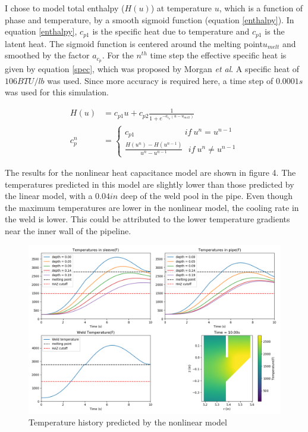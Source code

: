 \documentclass{article}
\makeatletter
\newcommand{\autocitel}[1]{\autocite{#1}\checknextarg}
\newcommand{\checknextarg}{\@ifnextchar\bgroup{\gobblenextarg}{}}
\newcommand{\gobblenextarg}[1]{$^,$\autocite{#1}\@ifnextchar\bgroup{\gobblenextarg}{}}
\makeatother
\begin{document}
	I chose to model total enthalpy ($H(u)$) at temperature $u$, which is a function of phase and temperature, by a smooth sigmoid function (equation \ref{enthalpy}). In equation \ref{enthalpy}, $c_{p1}$ is the specific heat due to temperature and $c_{p1}$ is the latent heat. The sigmoid function is centered around the melting point$u_{melt}$  and smoothed by the factor $a_{c_p}$. For the $n^{th}$ time step the effective specific heat is given by equation \ref{spec}, which was proposed by Morgan \textit{et al}\autocitel{morgan1978improved}. A specific heat of $106 BTU/lb$ was used. Since more accuracy is required here, a time step of $0.0001s$ was used for this simulation.  
	
\begin{align}
H(u) &= c_{p1} u + c_{p2} \frac{1}{1 + e^{-a_{c_p}(u - u_{melt})}} \label{enthalpy} \\
c_p^n &= \begin{cases}
c_{p1} \qquad \qquad \qquad if ~u^n = u^{n-1} \\
\frac{H(u^n) - H(u^{n-1})}{u^n - u^{n-1}}
 ~~~ if ~u^n \neq u^{n-1} \end{cases}\label{spec}
\end{align}    

The results for the nonlinear heat capacitance model are shown in figure 4. The temperatures predicted in this model are slightly lower than those predicted by the linear model, with a $0.04 in$ deep of the weld pool in the pipe. Even though the maximum temperatures are lower in the nonlinear model, the cooling rate in the weld is lower. This could be attributed to the lower temperature gradients near the inner wall of the pipeline.

\begin{figure}[h]
	\centering
	\includegraphics[width=14 cm]{nonlinear_results.png}
	\caption{ Temperature history predicted by the nonlinear model}
	\label{fig4}
\end{figure}
\end{document}
